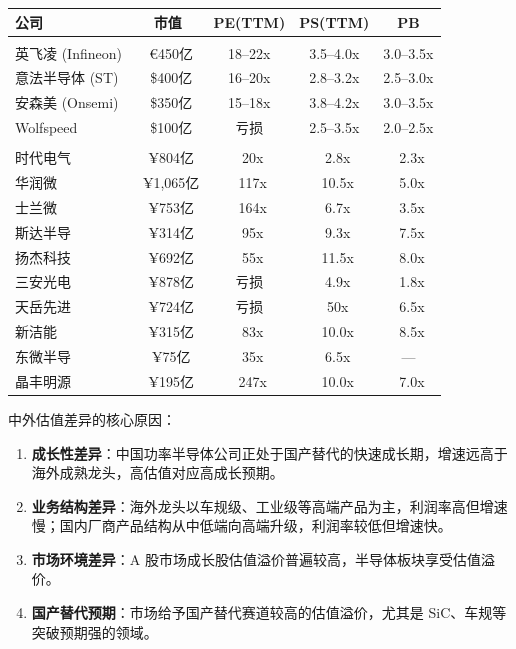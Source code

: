\begin{exhibitbox}[表 7-1：国内外功率半导体公司估值对比]
\centering
\small
\begin{tabularx}{\textwidth}{X c c c c}
\toprule
\textbf{公司} & \textbf{市值} & \textbf{PE(TTM)} & \textbf{PS(TTM)} & \textbf{PB} \\
\midrule
\rowcolor{lightgrey}
\multicolumn{5}{l}{\textit{海外龙头}} \\
英飞凌 (Infineon) & ~€450亿 & 18–22x & 3.5–4.0x & 3.0–3.5x \\
意法半导体 (ST) & ~\$400亿 & 16–20x & 2.8–3.2x & 2.5–3.0x \\
安森美 (Onsemi) & ~\$350亿 & 15–18x & 3.8–4.2x & 3.0–3.5x \\
Wolfspeed & ~\$100亿 & 亏损 & 2.5–3.5x & 2.0–2.5x \\
\midrule
\rowcolor{lightgrey}
\multicolumn{5}{l}{\textit{国内龙头}} \\
时代电气 & ~¥804亿 & ~20x & ~2.8x & ~2.3x \\
华润微 & ~¥1,065亿 & ~117x & ~10.5x & ~5.0x \\
士兰微 & ~¥753亿 & ~164x & ~6.7x & ~3.5x \\
斯达半导 & ~¥314亿 & ~95x & ~9.3x & ~7.5x \\
扬杰科技 & ~¥692亿 & ~55x & ~11.5x & ~8.0x \\
三安光电 & ~¥878亿 & 亏损 & ~4.9x & ~1.8x \\
天岳先进 & ~¥724亿 & 亏损 & ~50x & ~6.5x \\
新洁能 & ~¥315亿 & ~83x & ~10.0x & ~8.5x \\
东微半导 & ~¥75亿 & ~35x & ~6.5x & — \\
晶丰明源 & ~¥195亿 & ~247x & ~10.0x & ~7.0x \\
\bottomrule
\end{tabularx}
\end{exhibitbox}

中外估值差异的核心原因：

\begin{enumerate}[leftmargin=2em]
\item \textbf{成长性差异}：中国功率半导体公司正处于国产替代的快速成长期，增速远高于海外成熟龙头，高估值对应高成长预期。
\item \textbf{业务结构差异}：海外龙头以车规级、工业级等高端产品为主，利润率高但增速慢；国内厂商产品结构从中低端向高端升级，利润率较低但增速快。
\item \textbf\textbf{市场环境差异}：A 股市场成长股估值溢价普遍较高，半导体板块享受估值溢价。
\item \textbf{国产替代预期}：市场给予国产替代赛道较高的估值溢价，尤其是 SiC、车规等突破预期强的领域。
\end{enumerate}

